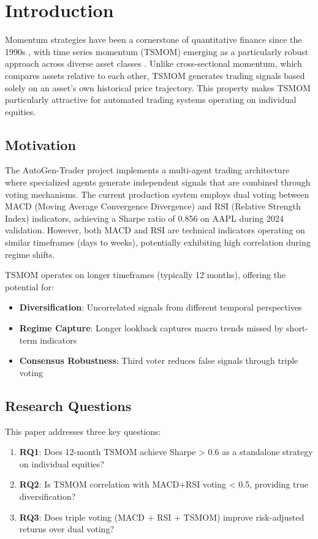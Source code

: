 \section{Introduction}

Momentum strategies have been a cornerstone of quantitative finance since the 1990s \cite{jegadeesh1993returns}, with time series momentum (TSMOM) emerging as a particularly robust approach across diverse asset classes \cite{moskowitz2012time}. Unlike cross-sectional momentum, which compares assets relative to each other, TSMOM generates trading signals based solely on an asset's own historical price trajectory. This property makes TSMOM particularly attractive for automated trading systems operating on individual equities.

\subsection{Motivation}

The AutoGen-Trader project implements a multi-agent trading architecture where specialized agents generate independent signals that are combined through voting mechanisms. The current production system employs dual voting between MACD (Moving Average Convergence Divergence) and RSI (Relative Strength Index) indicators, achieving a Sharpe ratio of 0.856 on AAPL during 2024 validation. However, both MACD and RSI are technical indicators operating on similar timeframes (days to weeks), potentially exhibiting high correlation during regime shifts.

TSMOM operates on longer timeframes (typically 12 months), offering the potential for:
\begin{itemize}
    \item \textbf{Diversification}: Uncorrelated signals from different temporal perspectives
    \item \textbf{Regime Capture}: Longer lookback captures macro trends missed by short-term indicators
    \item \textbf{Consensus Robustness}: Third voter reduces false signals through triple voting
\end{itemize}

\subsection{Research Questions}

This paper addresses three key questions:

\begin{enumerate}
    \item \textbf{RQ1}: Does 12-month TSMOM achieve Sharpe > 0.6 as a standalone strategy on individual equities?
    \item \textbf{RQ2}: Is TSMOM correlation with MACD+RSI voting < 0.5, providing true diversification?
    \item \textbf{RQ3}: Does triple voting (MACD + RSI + TSMOM) improve risk-adjusted returns over dual voting?
\end{enumerate}

